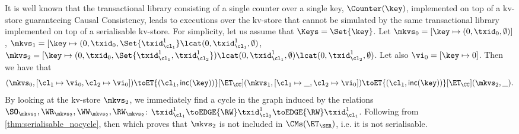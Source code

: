It is well known that the transactional library consisting of a single counter over a single 
key, $\Counter(\key)$, implemented on top of a kv-store guaranteeing Causal Consistency, 
leads to executions over the kv-store that cannot be simulated by the same transactional 
library implemented on top of a serialisable kv-store. 
For simplicity, let us assume that $\Keys = \Set{\key}$.
Let $\mkvs_{0} = [\key \mapsto (0, \txid_{0}, \emptyset)]$,  
$\mkvs_1 = [\key \mapsto (0, \txid_{0}, \Set{\txid_{\cl_1}^{1}} \lcat (0, \txid_{\cl_1}^{1}, \emptyset)$, 
$\mkvs_2 = [\key \mapsto (0, \txid_{0}, \Set{\txid_{\cl_1}^{1}, \txid_{\cl_2}^{1}}) \lcat (0, \txid_{\cl_1}^{1}, \emptyset) 
\lcat (0, \txid_{\cl_2}^{1}, \emptyset)$. Let also
$\vi_{0} = [\key \mapsto {0}]$. Then we have that 
\[
    (\mkvs_{0}, [\cl_1 \mapsto \vi_0, \cl_2 \mapsto \vi_0]) \toET{(\cl_1, \mathsf{inc(\key)})}[\ET_{\CC}]
    (\mkvs_1, [\cl_1 \mapsto \_, \cl_2 \mapsto \vi_0]) \toET{(\cl_1, \mathsf{inc(\key)})}[\ET_{\CC}]
(\mkvs_2, \_).
\]
By looking at the kv-store $\mkvs_{2}$, we immediately find a cycle in the graph induced by 
the relations $\SO_{\mkvs_{2}}, \WR_{\mkvs_{2}}, \WW_{\mkvs_{2}}, \RW_{\mkvs_{2}}$: 
$\txid_{\cl_1}^{1} \toEDGE{\RW} \txid_{\cl_2}^{1} \toEDGE{\RW} \txid_{\cl_1}^{1}$. 
Following from \cref{thm:serialisable_nocycle}, then 
which proves that $\mkvs_2$ is not included in $\CMs(\ET_{\SER})$, i.e. it is 
not serialisable.

